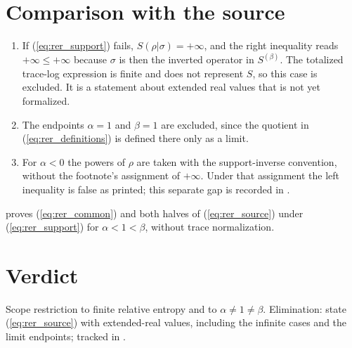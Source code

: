 \documentclass{article}
\begin{document}
\section{Comparison with the source}
\begin{enumerate}
\item If (\ref{eq:rer_support}) fails, $S(\rho|\sigma)=+\infty$, and the
    right inequality reads $+\infty\le+\infty$ because $\sigma$ is then the
    inverted operator in $S^{(\beta)}$. The totalized trace-log expression is
    finite and does not represent $S$, so this case is excluded. It is a
    statement about extended real values that is not yet formalized.
\item The endpoints $\alpha=1$ and $\beta=1$ are excluded, since the quotient
    in (\ref{eq:rer_definitions}) is defined there only as a limit.
\item For $\alpha<0$ the powers of $\rho$ are taken with the
    support-inverse convention, without the footnote's assignment of
    $+\infty$. Under that assignment the left inequality is false as printed;
    this separate gap is recorded in
    .
\end{enumerate}
 proves
(\ref{eq:rer_common}) and both halves of (\ref{eq:rer_source}) under
(\ref{eq:rer_support}) for $\alpha<1<\beta$, without trace normalization.

\section{Verdict}
Scope restriction to finite relative entropy and to $\alpha\ne1\ne\beta$.
Elimination: state (\ref{eq:rer_source}) with extended-real values,
including the infinite cases and the limit endpoints; tracked in
.



\end{document}
